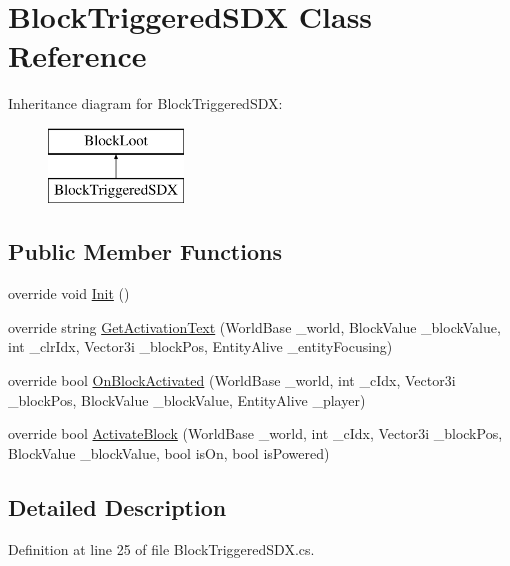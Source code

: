 \hypertarget{class_block_triggered_s_d_x}{}\section{Block\+Triggered\+S\+DX Class Reference}
\label{class_block_triggered_s_d_x}
Inheritance diagram for Block\+Triggered\+S\+DX\+:\begin{figure}[H]
\begin{center}
\leavevmode
\includegraphics[height=2.000000cm]{d7/d9c/class_block_triggered_s_d_x}
\end{center}
\end{figure}
\subsection*{Public Member Functions}
\begin{DoxyCompactItemize}
\item 
override void \mbox{\hyperlink{class_block_triggered_s_d_x_ab1f3e6b06186cba913e076dafc6b4624}{Init}} ()
\item 
override string \mbox{\hyperlink{class_block_triggered_s_d_x_ae8a8c155a8354cc445344d3d35d4cc96}{Get\+Activation\+Text}} (World\+Base \+\_\+world, Block\+Value \+\_\+block\+Value, int \+\_\+clr\+Idx, Vector3i \+\_\+block\+Pos, Entity\+Alive \+\_\+entity\+Focusing)
\item 
override bool \mbox{\hyperlink{class_block_triggered_s_d_x_ab8f68218bbac30a74c3d2c83ea017b44}{On\+Block\+Activated}} (World\+Base \+\_\+world, int \+\_\+c\+Idx, Vector3i \+\_\+block\+Pos, Block\+Value \+\_\+block\+Value, Entity\+Alive \+\_\+player)
\item 
override bool \mbox{\hyperlink{class_block_triggered_s_d_x_a37ee60834670abd0fbe2efe39da887a0}{Activate\+Block}} (World\+Base \+\_\+world, int \+\_\+c\+Idx, Vector3i \+\_\+block\+Pos, Block\+Value \+\_\+block\+Value, bool is\+On, bool is\+Powered)
\end{DoxyCompactItemize}


\subsection{Detailed Description}


Definition at line 25 of file Block\+Triggered\+S\+D\+X.\+cs.



